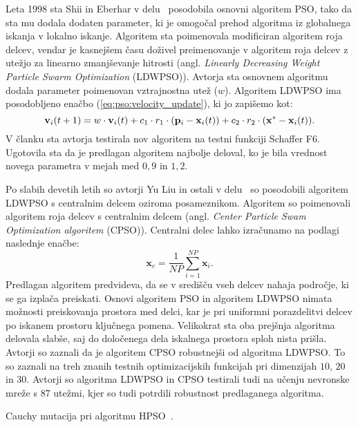 Leta 1998 sta Shii in Eberhar v delu~\cite{alg:ldwpso} posodobila osnovni algoritem PSO, tako da sta mu dodala dodaten parameter, ki je omogočal prehod algoritma iz globalnega iskanja v lokalno iskanje.
Algoritem sta poimenovala modificiran algoritem roja delcev, vendar je kasnejšem času doživel preimenovanje v algoritem roja delcev z utežjo za linearno zmanjševanje hitrosti (angl. \textit{Linearly Decreasing Weight Particle Swarm Optimization} (LDWPSO)).
Avtorja sta osnovnem algoritmu dodala parameter poimenovan vztrajnostna utež ($w$).
Algoritem LDWPSO ima posodobljeno enačbo (\ref{eq:pso:velocity_update}), ki jo zapišemo kot:
\begin{equation}
    \mathbf{v}_i(t + 1) = w \cdot \mathbf{v}_i(t) + c_1 \cdot r_1 \cdot (\mathbf{p}_i - \mathbf{x}_i(t)) + c_2 \cdot r_2 \cdot (\mathbf{x}^* - \mathbf{x}_i(t)).\label{eq:ldwpso:velocity_update} \\
\end{equation}
V članku sta avtorja testirala nov algoritem na testni funkciji Schaffer F6.
Ugotovila sta da je predlagan algoritem najbolje deloval, ko je bila vrednost novega parametra v mejah med $0{,}9$ in $1{,}2$.

Po slabih devetih letih so avtorji Yu Liu in ostali v delu~\cite{alg:cpso} so posodobili algoritem LDWPSO s centralnim delcem oziroma posameznikom.
Algoritem so poimenovali algoritem roja delcev s centralnim delcem (angl. \textit{Center Particle Swam Optimization algoritem} (CPSO)).
Centralni delec lahko izračunamo na podlagi naslednje enačbe:
\begin{equation}
    \mathbf{x}_c = \frac{1}{\mathit{NP}} \sum_{i=1}^{\mathit{NP}} \mathbf{x}_i.
\end{equation}
Predlagan algoritem predvideva, da se v središču vseh delcev nahaja področje, ki se ga izplača preiskati.
Osnovi algoritem PSO in algoritem LDWPSO nimata možnosti preiskovanja prostora med delci, kar je pri uniformni porazdelitvi delcev po iskanem prostoru ključnega pomena.
Velikokrat sta oba prejšnja algoritma delovala slabše, saj do določenega dela iskalnega prostora sploh nista prišla.
Avtorji so zaznali da je algoritem CPSO robustnejši od algoritma LDWPSO.
To so zaznali na treh znanih testnih optimizacijskih funkcijah pri dimenzijah $10$, $20$ in $30$.  
Avtorji so algoritma LDWPSO in CPSO testirali tudi na učenju nevronske mreže s $87$ utežmi, kjer so tudi potrdili robustnost predlaganega algoritma.

\begin{algorithm}
    \DontPrintSemicolon


    \caption{Cauchy mutacija pri algoritmu HPSO~\cite{alg:mpso}.}\label{pcode:hpso:addition}
\end{algorithm}

